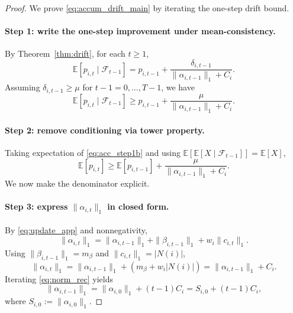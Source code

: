 \begin{proof}
We prove \eqref{eq:accum_drift_main} by iterating the one-step drift bound.

\paragraph{Step 1: write the one-step improvement under mean-consistency.}
By Theorem~\ref{thm:drift}, for each \(t\ge 1\),
\begin{equation}
\mathbb{E}[p_{i,t}\mid\mathcal{F}_{t-1}] = p_{i,t-1} + \frac{\delta_{i,t-1}}{\|\alpha_{i,t-1}\|_1+C_i}.
\label{eq:acc_step1}
\end{equation}
Assuming \(\delta_{i,t-1}\ge \mu\) for \(t-1=0,\dots,T-1\), we have
\begin{equation}
\mathbb{E}[p_{i,t}\mid\mathcal{F}_{t-1}] \ge p_{i,t-1} + \frac{\mu}{\|\alpha_{i,t-1}\|_1+C_i}.
\label{eq:acc_step1b}
\end{equation}

\paragraph{Step 2: remove conditioning via tower property.}
Taking expectation of \eqref{eq:acc_step1b} and using \(\mathbb{E}[\mathbb{E}[X\mid\mathcal{F}_{t-1}]]=\mathbb{E}[X]\),
\begin{equation}
\mathbb{E}[p_{i,t}] \ge \mathbb{E}[p_{i,t-1}] + \frac{\mu}{\|\alpha_{i,t-1}\|_1+C_i}.
\label{eq:acc_step2}
\end{equation}
We now make the denominator explicit.

\paragraph{Step 3: express $\|\alpha_{i,t}\|_1$ in closed form.}
By \eqref{eq:update_app} and nonnegativity,
\[
\|\alpha_{i,t}\|_1 = \|\alpha_{i,t-1}\|_1 + \|\beta_{i,t-1}\|_1 + w_i\|c_{i,t}\|_1.
\]
Using \(\|\beta_{i,t-1}\|_1=m_\beta\) and \(\|c_{i,t}\|_1=|N(i)|\),
\begin{equation}
\|\alpha_{i,t}\|_1 = \|\alpha_{i,t-1}\|_1 + (m_\beta+w_i|N(i)|) = \|\alpha_{i,t-1}\|_1 + C_i.
\label{eq:norm_rec}
\end{equation}
Iterating \eqref{eq:norm_rec} yields
\begin{equation}
\|\alpha_{i,t-1}\|_1 = \|\alpha_{i,0}\|_1 + (t-1)C_i = S_{i,0} + (t-1)C_i,
\label{eq:norm_closed}
\end{equation}
where \(S_{i,0}:=\|\alpha_{i,0}\|_1\).


\end{proof}
